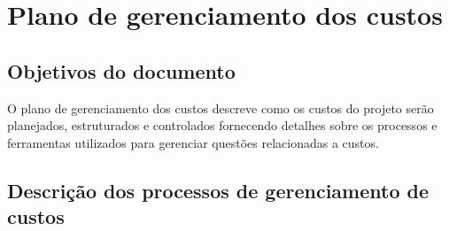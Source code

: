 
\chapter{Plano de gerenciamento dos custos}


\section{Objetivos do documento}

O plano de gerenciamento dos custos descreve como os custos do projeto serão planejados, estruturados e controlados fornecendo detalhes sobre os processos e ferramentas utilizados para gerenciar questões relacionadas a custos.

\section{Descrição dos processos de gerenciamento de custos}


